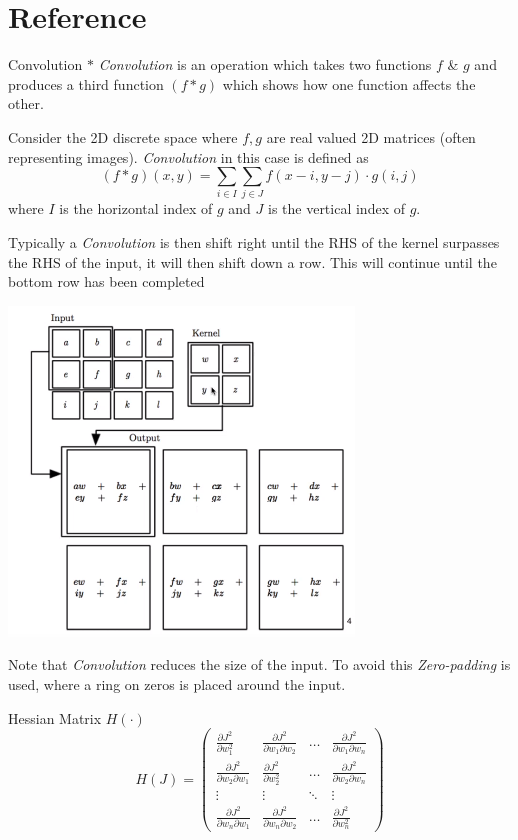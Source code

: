 \documentclass[11pt,a4paper]{article}
\begin{document}
\newpage
\setcounter{section}{-1}
\section{Reference}

  \begin{definition}{Convolution $*$}
    \textit{Convolution} is an operation which takes two functions $f$ \& $g$ and produces a third function $(f*g)$ which shows how one function affects the other.
    \par Consider the 2D discrete space where $f,g$ are real valued 2D matrices (often representing images). \textit{Convolution} in this case is defined as
    \[ (f*g)(x,y)=\sum_{i\in I}\sum_{j\in J}f(x-i,y-j)\cdot g(i,j) \]
    where $I$ is the horizontal index of $g$ and $J$ is the vertical index of $g$.
    \par Typically a \textit{Convolution} is then shift right until the RHS of the kernel surpasses the RHS of the input, it will then shift down a row. This will continue until the bottom row has been completed
    \begin{center}
      \includegraphics[width=.35\textwidth]{2dConvolution.PNG}
    \end{center}
    Note that \textit{Convolution} reduces the size of the input. To avoid this \textit{Zero-padding} is used, where a ring on zeros is placed around the input.
  \end{definition}

  \begin{definition}{Hessian Matrix $H(\cdot)$}
    \[ H(J)=\begin{pmatrix}\frac{\partial J^2}{\partial w_1^2}&\frac{\partial J^2}{\partial w_1\partial w_2}&\dots&\frac{\partial J^2}{\partial w_1\partial w_n}\\\frac{\partial J^2}{\partial w_2\partial w_1}&\frac{\partial J^2}{\partial w_2^2}&\dots&\frac{\partial J^2}{\partial w_2\partial w_n}\\\vdots&\vdots&\ddots&\vdots\\\frac{\partial J^2}{\partial w_n\partial w_1}&\frac{\partial J^2}{\partial w_n\partial w_2}&\dots&\frac{\partial J^2}{\partial w_n^2}\end{pmatrix}\]
  \end{definition}
\end{document}
